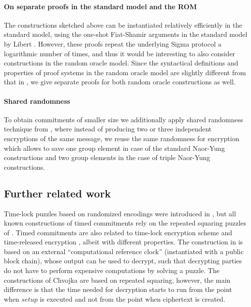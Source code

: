 \paragraph{On separate proofs in the standard model and the ROM}
The constructions sketched above can be instantiated relatively efficiently in the standard model, using the one-shot Fiat-Shamir arguments in the standard model by Libert \etal \cite{Libert2021OneShotFN}. However, these proofs repeat the underlying Sigma protocol a logarithmic number of times, and thus it would be interesting to also consider constructions in the random oracle model.
Since the syntactical definitions and properties of proof systems in the random oracle model are slightly different from that in \cite{Libert2021OneShotFN}, we give separate proofs for both random oracle constructions as well. 

\paragraph{Shared randomness} To obtain commitments of smaller size we additionally apply shared randomness technique from \cite{SCN:BiaMasVen16}, where instead of producing two or three independent encryptions of the same message, we reuse the same randomness for encryption which allows to save one group element in case of the standard Naor-Yung constructions and two group elements in the case of triple Naor-Yung constructions.

\subsection{Further related work}
Time-lock puzzles based on randomized encodings were introduced in \cite{TCC:BDGM19}, but all known constructions of timed commitments rely on the repeated squaring puzzles of \cite{RSW96}.
Timed commitments are also related to time-lock encryption scheme \cite{liu2018build} and time-released encryption \cite{ESORICS:CJSS21}, albeit with different properties. The construction in \cite{liu2018build} is based on an external ``computational reference clock'' (instantiated with a public block chain), whose output can be used to decrypt, such that decrypting parties do not have to perform expensive computations by solving a puzzle. The constructions of Chvojka \etal \cite{ESORICS:CJSS21} are based on repeated squaring, however, the main difference is that the time needed for decryption starts to run from the point when $setup$ is executed and not from the point when ciphertext is created. 


